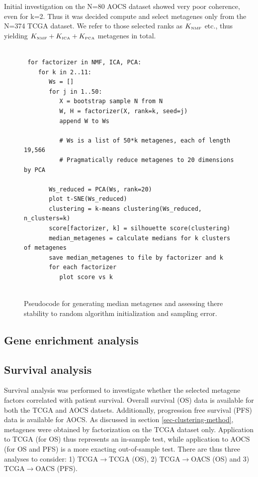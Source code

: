 \documentclass[tikz, 12pt,a4paper,oneside,fleqn]{article}
\begin{document}
Initial investigation on the N=80 AOCS dataset showed very poor coherence, even for k=2.   Thus it was decided compute and select metagenes only from the N=374 TCGA dataset.   We refer to those selected ranks as $K_{\mbox{\tiny NMF}}$ etc., thus yielding $K_{\mbox{\tiny NMF}} + K_{\mbox{\tiny ICA}} + K_{\mbox{\tiny PCA}}$ metagenes in total.

\begin{figure}
\begin{center}
\begin{Verbatim}[baselinestretch=1, frame=single, rulecolor=\color{blue}, label=Metagene Stability Assessment, fontfamily=courier, fontsize=\small]

 for factorizer in NMF, ICA, PCA:
    for k in 2..11:
       Ws = []
       for j in 1..50:
          X = bootstrap sample N from N
          W, H = factorizer(X, rank=k, seed=j)
          append W to Ws
   	     
          # Ws is a list of 50*k metagenes, each of length 19,566
          # Pragmatically reduce metagenes to 20 dimensions by PCA
   	  
       Ws_reduced = PCA(Ws, rank=20)
       plot t-SNE(Ws_reduced)
       clustering = k-means clustering(Ws_reduced, n_clusters=k)
       score[factorizer, k] = silhouette score(clustering)	  
       median_metagenes = calculate medians for k clusters of metagenes
       save median_metagenes to file by factorizer and k
       for each factorizer 
          plot score vs k
      
\end{Verbatim}
\end{center}
\caption{Pseudocode for generating median metagenes and assessing there stability to random algorithm initialization and sampling error.}
\label{fig-clustering-psuedocode}
\end{figure}
	   	  
\subsection{Gene enrichment analysis}

\subsection{Survival analysis}

Survival analysis was performed to investigate whether the selected metagene factors correlated with patient survival.  Overall  survival (OS) data is available for both the TCGA and AOCS datsets.  Additionally, progression free survival (PFS) data is available for AOCS.   As discussed in section \ref{sec-clustering-method}, metagenes were obtained by factorization on the TCGA dataset only.  Application to TCGA (for OS) thus represents an in-sample test, while application to AOCS (for OS and PFS) is a more exacting out-of-sample test. There are thus three analyses to consider: 1) TCGA$\rightarrow$TCGA (OS), 2) TCGA$\rightarrow$OACS (OS) and 3) TCGA$\rightarrow$OACS (PFS).
\end{document}
